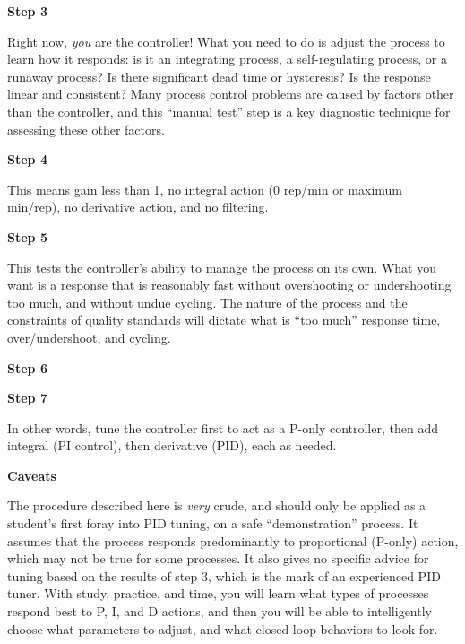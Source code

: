 \vskip 10pt

\noindent
{\bf Step 3}

  Right now, {\it you} are the controller!  What you need to do is adjust the process to learn how it responds: is it an integrating process, a self-regulating process, or a runaway process?  Is there significant dead time or hysteresis?  Is the response linear and consistent?  Many process control problems are caused by factors other than the controller, and this ``manual test'' step is a key diagnostic technique for assessing these other factors.

\vskip 10pt

\noindent
{\bf Step 4}

  This means gain less than 1, no integral action (0 rep/min or maximum min/rep), no derivative action, and no filtering.

\vskip 10pt

\noindent
{\bf Step 5}

  This tests the controller's ability to manage the process on its own.  What you want is a response that is reasonably fast without overshooting or undershooting too much, and without undue cycling.  The nature of the process and the constraints of quality standards will dictate what is ``too much'' response time, over/undershoot, and cycling.

\vskip 10pt

\noindent
{\bf Step 6}


\vskip 10pt

\noindent
{\bf Step 7}

  In other words, tune the controller first to act as a P-only controller, then add integral (PI control), then derivative (PID), each as needed.

\filbreak

\centerline{\bf Caveats}

\vskip 10pt

The procedure described here is {\it very} crude, and should only be applied as a student's first foray into PID tuning, on a safe ``demonstration'' process.  It assumes that the process responds predominantly to proportional (P-only) action, which may not be true for some processes.  It also gives no specific advice for tuning based on the results of step 3, which is the mark of an experienced PID tuner.  With study, practice, and time, you will learn what types of processes respond best to P, I, and D actions, and then you will be able to intelligently choose what parameters to adjust, and what closed-loop behaviors to look for.

